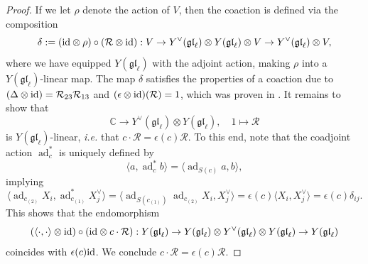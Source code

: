 \documentclass[11pt]{report}
\newtheorem{lemma}[theorem]{Lemma}
\theoremstyle{definition}
\theoremstyle{remark}
\theoremstyle{remark}
\newcommand{\End}{\operatorname{End}}
\newcommand{\id}{\textnormal{id}}
\newcommand{\C}{\mathbb{C}}
\begin{document}
\begin{proof}
If we let $\rho$ denote the action of $V$, then the coaction is defined via the composition
\begin{equation*}
\delta := (\id \otimes \rho) \circ (\mathcal{R} \otimes \id): V \to Y^\vee(\mathfrak{gl}_\ell) \otimes Y(\mathfrak{gl}_\ell) \otimes V \to Y^\vee(\mathfrak{gl}_\ell) \otimes V,
\end{equation*}
where we have equipped $Y(\mathfrak{gl}_\ell)$ with the adjoint action, making $\rho$ into a $Y(\mathfrak{gl}_\ell)$-linear map. The map $\delta$ satisfies the properties of a coaction due to $(\Delta \otimes \id) = \mathcal{R}_{23} \mathcal{R}_{13}$ and $(\epsilon \otimes \id)(\mathcal{R}) = 1$, which was proven in \cite{article:nazarov:2019}. It remains to show that
\begin{equation*}
\C \to Y^\vee(\mathfrak{gl}_\ell) \otimes Y(\mathfrak{gl}_\ell), \quad 1 \mapsto \mathcal{R}
\end{equation*}
is $Y(\mathfrak{gl}_\ell)$-linear, \emph{i.e.} that $c \cdot \mathcal{R} = \epsilon(c) \mathcal{R}$. To this end, note that the coadjoint action $\operatorname{ad}_c^*$ is uniquely defined by
\begin{equation*}
\langle a,\operatorname{ad}_c^* b \rangle = \langle \operatorname{ad}_{S(c)} a,b \rangle,
\end{equation*}
implying
\begin{equation*}
\langle \operatorname{ad}_{c_{(2)}} X_i, \operatorname{ad}_{c_{(1)}}^* X_j^\vee \rangle = \langle \operatorname{ad}_{S(c_{(1)})} \operatorname{ad}_{c_{(2)}} X_i, X_j^\vee \rangle = \epsilon(c) \langle X_i,X_j^\vee \rangle = \epsilon(c) \delta_{ij}.
\end{equation*}
This shows that the endomorphism
\begin{equation*}
(\langle \cdot,\cdot \rangle \otimes \id) \circ (\id \otimes c \cdot \mathcal{R}): Y(\mathfrak{gl}_\ell) \to Y(\mathfrak{gl}_\ell) \otimes Y^\vee(\mathfrak{gl}_\ell) \otimes Y(\mathfrak{gl}_\ell) \to Y(\mathfrak{gl}_\ell)
\end{equation*}
coincides with $\epsilon(c) \id$. We conclude $c \cdot \mathcal{R} = \epsilon(c) \mathcal{R}$.
\end{proof}

%
\end{document}
